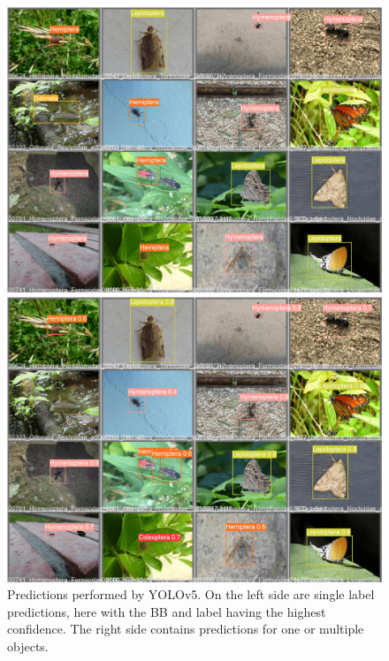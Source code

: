 \begin{figure}[!ht]
    \centering
    \begin{minipage}{.475\textwidth}
        \includegraphics[width=\textwidth]{images/val_batch2_labels.png}
    \end{minipage}
    \hfill
    \begin{minipage}{.475\textwidth}
        \includegraphics[width=\textwidth]{images/val_batch2_pred.png}
    \end{minipage}
    \caption{Predictions performed by YOLOv5. On the left side are single label predictions, here with the BB and label having the highest confidence. The right side contains predictions for one or multiple objects.}
    \label{fig:yolo-predictions}
\end{figure}
